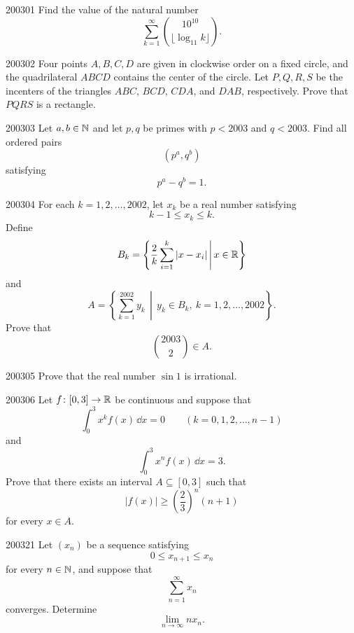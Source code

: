 
\begin{problem}{2003}{0}{1}
Find the value of the natural number
\[
    \sum_{k=1}^{\infty}
    \binom{10^{10}}{\lfloor\log_{11}k\rfloor}.
\]
\end{problem}

\begin{problem}{2003}{0}{2}
Four points $A, B, C, D$ are given in clockwise order on a fixed circle, and the quadrilateral $ABCD$ contains the center of the circle. Let $P, Q, R, S$ be the incenters of the triangles $ABC$, $BCD$, $CDA$, and $DAB$, respectively. Prove that $PQRS$ is a rectangle.
\end{problem}

\begin{problem}{2003}{0}{3}
Let $a, b\in\mathbb{N}$ and let $p, q$ be primes with $p<2003$ and $q<2003$. Find all ordered pairs
\[
    (p^a, q^b)
\]
satisfying
\[
    p^a-q^b=1.
\]
\end{problem}

\begin{problem}{2003}{0}{4}
For each $k=1, 2, \dots, 2002$, let $x_k$ be a real number satisfying
\[
    k-1\le x_k\le k.
\]
Define
\[
    B_k
    =
    \left\{
        \frac{2}{k}\sum_{i=1}^k|x-x_i|
        \, \middle|\,
        x\in\mathbb{R}
    \right\}
\]
and
\[
    A
    =
    \left\{
        \sum_{k=1}^{2002}y_k
        \, \middle|\,
        y_k\in B_k, \ k=1, 2, \dots, 2002
    \right\}.
\]
Prove that
\[
    \binom{2003}{2}\in A.
\]
\end{problem}

\begin{problem}{2003}{0}{5}
Prove that the real number $\sin 1$ is irrational.
\end{problem}

\begin{problem}{2003}{0}{6}
Let $f\colon[0, 3]\to\mathbb{R}$ be continuous and suppose that
\[
    \int_0^3 x^k f(x)\, \dd x=0
    \qquad
    (k=0, 1, 2, \dots, n-1)
\]
and
\[
    \int_0^3 x^n f(x)\, \dd x=3.
\]
Prove that there exists an interval $A\subseteq[0, 3]$ such that
\[
    |f(x)|\ge\left(\frac23\right)^n(n+1)
\]
for every $x\in A$.
\end{problem}

\begin{problem}{2003}{2}{1}
Let $(x_n)$ be a sequence satisfying
\[
    0\le x_{n+1}\le x_n
\]
for every $n\in\mathbb{N}$, and suppose that
\[
    \sum_{n=1}^{\infty}x_n
\]
converges. Determine
\[
    \lim_{n\to\infty}n x_n.
\]
\end{problem}

